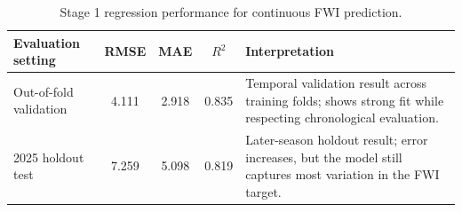 \begin{table}[htbp]
\centering
\caption{Stage 1 regression performance for continuous FWI prediction.}
\label{tab:stage1-regression-metrics}
\begin{tabularx}{\textwidth}{l c c c X}
\toprule
Evaluation setting & RMSE & MAE & \(R^2\) & Interpretation \\
\midrule
Out-of-fold validation & 4.111 & 2.918 & 0.835 &
Temporal validation result across training folds; shows strong fit while
respecting chronological evaluation. \\
2025 holdout test & 7.259 & 5.098 & 0.819 &
Later-season holdout result; error increases, but the model still captures
most variation in the FWI target. \\
\bottomrule
\end{tabularx}
\end{table}
